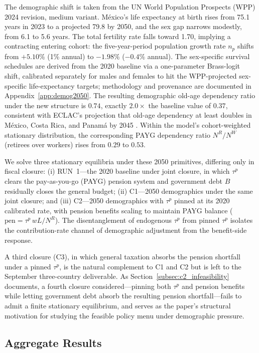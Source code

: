 \documentclass[12pt,a4paper]{article}
\begin{document}
The demographic shift is taken from the UN World Population Prospects (WPP) 2024 revision, medium variant. M\'exico's life expectancy at birth rises from 75.1 years in 2023 to a projected 79.8 by 2050, and the sex gap narrows modestly, from 6.1 to 5.6 years. The total fertility rate falls toward 1.70, implying a contracting entering cohort: the five-year-period population growth rate $n_p$ shifts from $+5.10\%$ (1\% annual) to $-1.98\%$ ($-0.4\%$ annual). The sex-specific survival schedules are derived from the 2020 baseline via a one-parameter Brass-logit shift, calibrated separately for males and females to hit the WPP-projected sex-specific life-expectancy targets; methodology and provenance are documented in Appendix~\ref{app:demog2050}. The resulting demographic old-age dependency ratio under the new structure is $0.74$, exactly $2.0\times$ the baseline value of $0.37$, consistent with ECLAC's projection that old-age dependency at least doubles in M\'exico, Costa Rica, and Panam\'a by 2045 \citep{ECLAC2022}. Within the model's cohort-weighted stationary distribution, the corresponding PAYG dependency ratio $N^R/N^W$ (retirees over workers) rises from $0.29$ to $0.53$.

We solve three stationary equilibria under these 2050 primitives, differing only in fiscal closure: (i) RUN~1---the 2020 baseline under joint closure, in which $\tau^p$ clears the pay-as-you-go (PAYG) pension system and government debt $B$ residually closes the general budget; (ii) C1---2050 demographics under the same joint closure; and (iii) C2---2050 demographics with $\tau^p$ pinned at its 2020 calibrated rate, with pension benefits scaling to maintain PAYG balance ($\text{pen} = \tau^p\, wL / N^R$). The disentanglement of endogenous $\tau^p$ from pinned $\tau^p$ isolates the contribution-rate channel of demographic adjustment from the benefit-side response.

A third closure (C3), in which general taxation absorbs the pension shortfall under a pinned $\tau^p$, is the natural complement to C1 and C2 but is left to the September three-country deliverable. As Section~\ref{subsec:c2_infeasibility} documents, a fourth closure considered---pinning both $\tau^p$ and pension benefits while letting government debt absorb the resulting pension shortfall---fails to admit a finite stationary equilibrium, and serves as the paper's structural motivation for studying the feasible policy menu under demographic pressure.

\subsection{Aggregate Results}
\label{subsec:aging_aggregates}
\end{document}
